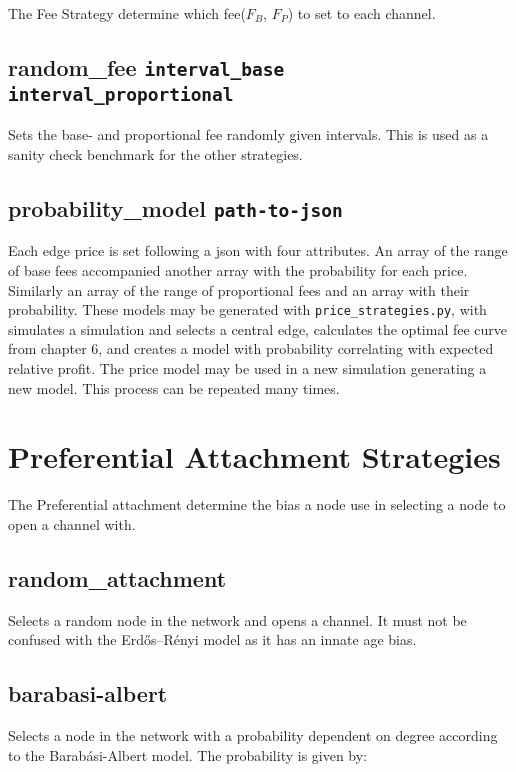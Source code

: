 The Fee Strategy determine which fee($F_B$, $F_P$) to set to each channel.

\subsection*{random\_fee \texttt{interval\_base} \texttt{interval\_proportional}}

Sets the base- and proportional fee randomly given intervals. This is used as a sanity check benchmark for the other strategies.

\subsection*{probability\_model \texttt{path-to-json}}

Each edge price is set following a json with four attributes. An array of the range of base fees accompanied another array with the probability for each price. Similarly an array of the range of proportional fees and an array with their probability. These models may be generated with \texttt{price\_strategies.py}, with simulates a simulation and selects a central edge, calculates the optimal fee curve from chapter 6, and creates a model with probability correlating with expected relative profit. The price model may be used in a new simulation generating a new model. This process can be repeated many times.  

\section*{Preferential Attachment Strategies}

The Preferential attachment determine the bias a node use in selecting a node to open a channel with.

\subsection*{random\_attachment}

Selects a random node in the network and opens a channel. It must not be confused with the Erdős–Rényi model as it has an innate age bias.

\subsection*{barabasi-albert}

Selects a node in the network with a probability dependent on degree according to the Barabási-Albert model. The probability is given by:

